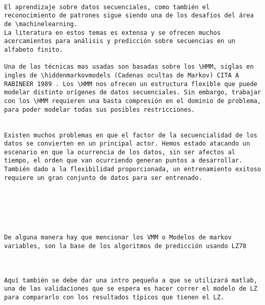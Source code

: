 
\begin{lstlisting}

El aprendizaje sobre datos secuenciales, como también el reconocimiento de patrones sigue siendo una de los desafíos del área de \machinelearning.
La literatura en estos temas es extensa y se ofrecen muchos acercamientos para análisis y predicción sobre secuencias en un alfabeto finito.

Una de las técnicas mas usadas son basadas sobre los \HMM, siglas en ingles de \hiddenmarkovmodels (Cadenas ocultas de Markov) CITA A RABINEER 1989 . Los \HMM nos ofrecen un estructura flexible que puede modelar distinto orígenes de datos secuenciales. Sin embargo, trabajar con los \HMM requieren una basta compresión en el dominio de problema, para poder modelar todas sus posibles restricciones.


Existen muchos problemas en que el factor de la secuencialidad de los datos se convierten en un principal actor. Hemos estado atacando un escenario en que la ocurrencia de los datos, sin ser afectos al tiempo, el orden que van ocurriendo generan puntos a desarrollar. También dado a la flexibilidad proporcionada, un entrenamiento exitoso requiere un gran conjunto de datos para ser entrenado.

 




De alguna manera hay que mencionar los VMM o Modelos de markov variables, son la base de los algoritmos de predicción usando LZ78



Aquí también se debe dar una intro pequeña a que se utilizará matlab, una de las validaciones que se espera es hacer correr el modelo de LZ para compararlo con los resultados típicos que tienen el LZ.

\end{lstlisting}